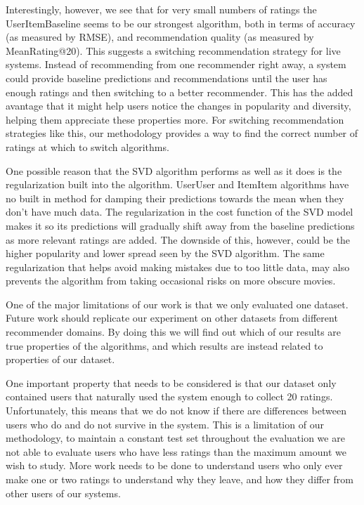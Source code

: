 \documentclass[letterpaper]{sig-alternate}
\begin{document}
  Interestingly, however, we see that for very small numbers of ratings the UserItemBaseline seems to be our strongest algorithm, both in terms of accuracy (as measured by RMSE), and recommendation quality (as measured by MeanRating@20).
  This suggests a switching recommendation strategy for live systems.
  Instead of recommending from one recommender right away, a system could provide baseline predictions and recommendations until the user has enough ratings and then switching to a better recommender.
  This has the added avantage that it might help users notice the changes in popularity and diversity, helping them appreciate these properties more.
  For switching recommendation strategies like this, our methodology provides a way to find the correct number of ratings at which to switch algorithms.

  One possible reason that the SVD algorithm performs as well as it does is the regularization built into the algorithm.
  UserUser and ItemItem algorithms have no built in method for damping their predictions towards the mean when they don't have much data.
  The regularization in the cost function of the SVD model makes it so its predictions will gradually shift away from the baseline predictions as more relevant ratings are added.
  The downside of this, however, could be the higher popularity and lower spread seen by the SVD algorithm.
  The same regularization that helps avoid making mistakes due to too little data, may also prevents the algorithm from taking occasional risks on more obscure movies.
  


  One of the major limitations of our work is that we only evaluated one dataset.
  Future work should replicate our experiment on other datasets from different recommender domains.
  By doing this we will find out which of our results are true properties of the algorithms, and which results are instead related to properties of our dataset.

  One important property that needs to be considered is that our dataset only contained users that naturally used the system enough to collect 20 ratings.
  Unfortunately, this means that we do not know if there are differences between users who do and do not survive in the system.
  This is a limitation of our methodology, to maintain a constant test set throughout the evaluation we are not able to evaluate users who have less ratings than the maximum amount we wish to study.
  More work needs to be done to understand users who only ever make one or two ratings to understand why they leave, and how they differ from other users of our systems.
\end{document}
